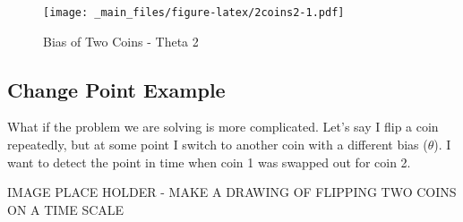 \documentclass[]{book}
\theoremstyle{definition}
\theoremstyle{definition}
\theoremstyle{definition}
\theoremstyle{remark}
\begin{document}
\begin{figure}
\centering
\texttt{[image: \_main\_files/figure-latex/2coins2-1.pdf]}
\caption{\label{fig:2coins2}Bias of Two Coins - Theta 2}
\end{figure}

\subsection{Change Point Example}\label{change-point-example}

What if the problem we are solving is more complicated. Let's say I flip
a coin repeatedly, but at some point I switch to another coin with a
different bias (\(\theta\)). I want to detect the point in time when
coin 1 was swapped out for coin 2.

IMAGE PLACE HOLDER - MAKE A DRAWING OF FLIPPING TWO COINS ON A TIME
SCALE
\end{document}
